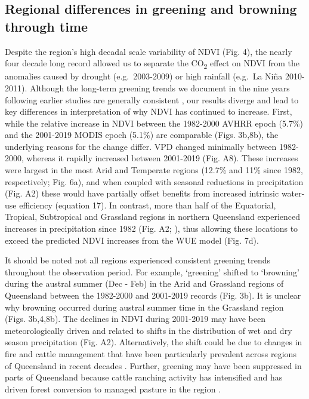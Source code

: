 \documentclass[gc, manuscript]{copernicus}
\begin{document}
\subsection{Regional differences in greening and browning through time}

Despite the region's high decadal scale variability of NDVI (Fig. 4),
the nearly four decade long record allowed us to separate the
CO\textsubscript{2} effect on NDVI from the anomalies caused by drought
(e.g.~2003-2009) or high rainfall (e.g.~La Niña 2010-2011). Although the
long-term greening trends we document in the nine years following
earlier studies are generally consistent
\citep{donohueClimaterelatedTrendsAustralian2009c, ukkolaReducedStreamflowWaterstressed2016b},
our results diverge and lead to key differences in interpretation of why
NDVI has continued to increase. First, while the relative increase in
NDVI between the 1982-2000 AVHRR epoch (5.7\%) and the 2001-2019 MODIS
epoch (5.1\%) are comparable (Figs. 3b,8b), the underlying reasons for
the change differ. VPD changed minimally between 1982-2000, whereas it
rapidly increased between 2001-2019 (Fig. A8). These increases were
largest in the most Arid and Temperate regions (12.7\% and 11\% since
1982, respectively; Fig. 6a), and when coupled with seasonal reductions
in precipitation (Fig. A2) these would have partially offset benefits
from increased intrinsic water-use efficiency (equation 17). In
contrast, more than half of the Equatorial, Tropical, Subtropical and
Grassland regions in northern Queensland experienced increases in
precipitation since 1982 (Fig. A2;
\citet{ukkolaExploringStationarityAustralian2019c}), thus allowing these
locations to exceed the predicted NDVI increases from the WUE model
(Fig. 7d).

It should be noted not all regions experienced consistent greening
trends throughout the observation period. For example, `greening'
shifted to `browning' during the austral summer (Dec - Feb) in the Arid
and Grassland regions of Queensland between the 1982-2000 and 2001-2019
records (Fig. 3b). It is unclear why browning occurred during austral
summer time in the Grassland region (Figs. 3b,4,8b). The declines in
NDVI during 2001-2019 may have been meteorologically driven and related
to shifts in the distribution of wet and dry season precipitation (Fig.
A2). Alternatively, the shift could be due to changes in fire and cattle
management that have been particularly prevalent across regions of
Queensland in recent decades \citep{seabrookCattleCropsClearing2006}.
Further, greening may have been suppressed in parts of Queensland
because cattle ranching activity has intensified and has driven forest
conversion to managed pasture in the region
\citep{mcalpineIncreasingWorldConsumption2009}.
\end{document}
